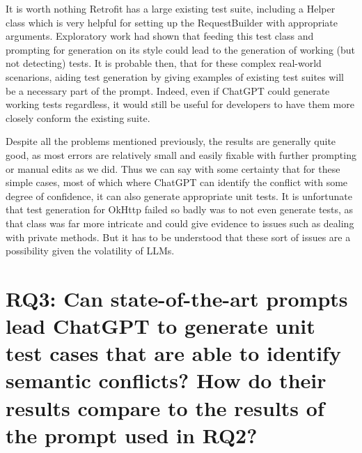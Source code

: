 It is worth nothing Retrofit has a large existing test suite, including a Helper class which is very helpful for setting up the RequestBuilder with appropriate arguments.
Exploratory work had shown that feeding this test class and prompting for generation on its style could lead to the generation of working (but not detecting) tests. It is probable then,
that for these complex real-world scenarions, aiding test generation by giving examples of existing test suites will be a necessary part of the prompt. Indeed, even if ChatGPT could generate
working tests regardless, it would still be useful for developers to have them more closely conform the existing suite.

Despite all the problems mentioned previously, the results are generally quite good, as most errors are relatively small and easily fixable with further prompting or manual edits as we did.
Thus we can say with some certainty that for these simple cases, most of which where ChatGPT can identify the conflict with some degree of confidence, it can also generate appropriate unit tests.
It is unfortunate that test generation for OkHttp failed so badly was to not even generate tests, as that class was far more intricate and could give evidence to issues such as dealing with
private methods. But it has to be understood that these sort of issues are a possibility given the volatility of LLMs.



\section{RQ3: Can state-of-the-art prompts lead ChatGPT to generate
unit test cases that are able to identify semantic conflicts?  How do their
results compare to the results of the prompt used in RQ2?}\label{sec:results:rq3}



